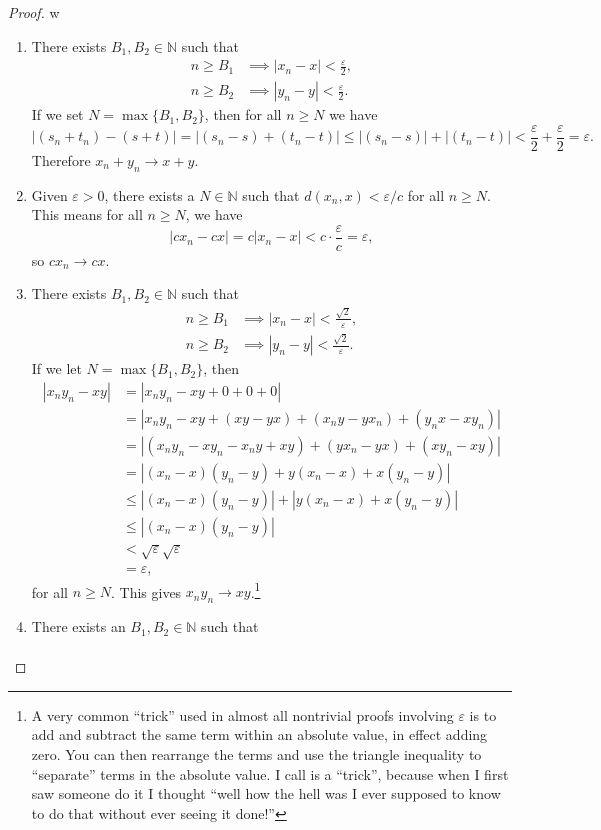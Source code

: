\documentclass{article}
\newcommand{\N}{\mathbb{N}}
\theoremstyle{definition}
\begin{document}
	\begin{proof}{\color{white}w}
		\begin{enumerate}
			\item There exists $ B_1,B_2\in\N $ such that  
			\begin{align*}
				n\ge B_1&\implies |x_n-x|<\frac{\varepsilon}{2},\\
				n\ge B_2&\implies |y_n-y|<\frac{\varepsilon}{2}.
			\end{align*} 
			If we set $ N=\max\{B_1,B_2\} $, then for all $ n\ge N $ we have $$ |(s_n+t_n)-(s+t)|=|(s_n-s)+(t_n-t)|\le|(s_n-s)|+|(t_n-t)|<\frac{\varepsilon}{2}+\frac{\varepsilon}{2}=\varepsilon.$$ Therefore $ x_n+y_n\to x+y $.
			\item Given $ \varepsilon>0 $, there exists a $ N\in\N $ such that $ d(x_n,x)<\varepsilon/c$ for all $ n\ge N $. This means for all $ n\ge N $, we have $$ |cx_n-cx|=c|x_n-x|<c\cdot\frac{\varepsilon}{c}=\varepsilon ,$$ so $ cx_n\to cx $. 
			\item There exists $ B_1,B_2\in\N $ such that  
			\begin{align*}
				n\ge B_1&\implies |x_n-x|<\frac{\sqrt{2}}{\varepsilon},\\
				n\ge B_2&\implies |y_n-y|<\frac{\sqrt{2}}{\varepsilon}.
			\end{align*} 
			If we let $ N=\max\{B_1,B_2\} $, then \begin{align*}
				|x_ny_n-xy|&=|x_ny_n-xy+0+0+0|\\&=|x_ny_n-xy+(xy-yx)+(x_ny-yx_n)+(y_nx-xy_n)|\\&=|(x_ny_n-xy_n-x_ny+xy)+(yx_n-yx)+(xy_n-xy)|\\&=|(x_n-x)(y_n-y)+y(x_n-x)+x(y_n-y)|\\&\le|(x_n-x)(y_n-y)|+|y(x_n-x)+x(y_n-y)|\\&\le|(x_n-x)(y_n-y)|\\&<\sqrt{\varepsilon}\sqrt{\varepsilon}\\&=\varepsilon,
			\end{align*}
			for all $ n\ge N $. This gives $ x_ny_n\to xy $.\footnote{A very common ``trick'' used in almost all nontrivial proofs involving $ \varepsilon $ is to add and subtract the same term within an absolute value, in effect adding zero. You can then rearrange the terms and use the triangle inequality to ``separate'' terms in the absolute value. I call is a ``trick'', because when I first saw someone do it I thought ``well how the hell was I ever supposed to know to do that without ever seeing it done!''}
			\item There exists an $ B_1,B_2\in\N $ such that \begin{align*}

\end{align*}
\end{enumerate}
\end{proof}
\end{document}

